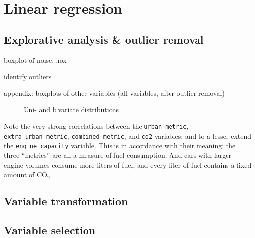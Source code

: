 \documentclass[a4paper, 12pt]{article}
\newcommand{\var}[1]{\texttt{#1}}
\begin{document}


\section{Linear regression}

\subsection*{Explorative analysis \& outlier removal}

boxplot of noise, nox

identify outliers

appendix: boxplots of other variables (all variables, after outlier removal)

\begin{figure}
  \caption{Uni- and bivariate distributions}
  \label{pairs}
\end{figure}

Note the very strong correlations between the \var{urban\_metric}, \var{extra\_urban\_metric}, \var{combined\_metric}, and \var{co2} variables; and to a lesser extend the \var{engine\_capacity} variable. This is in accordance with their meaning: the three ``metrics'' are all a measure of fuel consumption. And cars with larger engine volumes consume more liters of fuel, and every liter of fuel contains a fixed amount of $\mathrm{CO_2}$.

\subsection*{Variable transformation}
\subsection*{Variable selection}
\end{document}
